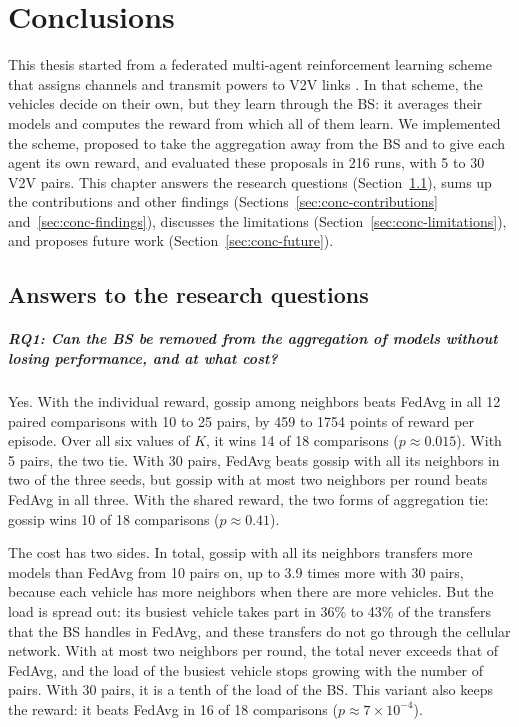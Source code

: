 \chapter{Conclusions}
\label{chap:conclusions}

This thesis started from a federated multi-agent reinforcement learning scheme that assigns channels and
transmit powers to \ac{V2V} links \cite{li+22fedmarl}. In that scheme, the vehicles decide on their own, but
they learn through the \ac{BS}: it averages their models and computes the reward from which all of them learn.
We implemented the scheme, proposed to take the aggregation away from the \ac{BS} and to give each agent its
own reward, and evaluated these proposals in 216 runs, with 5 to 30 \ac{V2V} pairs. This chapter answers the
research questions (Section~\ref{sec:conc-answers}), sums up the contributions and other findings
(Sections~\ref{sec:conc-contributions} and~\ref{sec:conc-findings}), discusses the limitations
(Section~\ref{sec:conc-limitations}), and proposes future work (Section~\ref{sec:conc-future}).

\section{Answers to the research questions}
\label{sec:conc-answers}

\paragraph{RQ1: Can the BS be removed from the aggregation of models without losing performance, and at what
cost?} Yes. With the individual reward, gossip among neighbors beats \ac{FedAvg} in all 12 paired comparisons
with 10 to 25 pairs, by 459 to 1754 points of reward per episode. Over all six values of $K$, it wins 14 of 18
comparisons ($p \approx 0.015$). With 5 pairs, the two tie. With 30 pairs, \ac{FedAvg} beats gossip with all
its neighbors in two of the three seeds, but gossip with at most two neighbors per round beats \ac{FedAvg} in
all three. With the shared reward, the two forms of aggregation tie: gossip wins 10 of 18 comparisons
($p \approx 0.41$).

The cost has two sides. In total, gossip with all its neighbors transfers more models than \ac{FedAvg} from 10
pairs on, up to 3.9 times more with 30 pairs, because each vehicle has more neighbors when there are more
vehicles. But the load is spread out: its busiest vehicle takes part in 36\% to 43\% of the transfers that the
\ac{BS} handles in \ac{FedAvg}, and these transfers do not go through the cellular network. With at most two
neighbors per round, the total never exceeds that of \ac{FedAvg}, and the load of the busiest vehicle stops
growing with the number of pairs. With 30 pairs, it is a tenth of the load of the \ac{BS}. This variant also
keeps the reward: it beats \ac{FedAvg} in 16 of 18 comparisons ($p \approx 7 \times 10^{-4}$).

